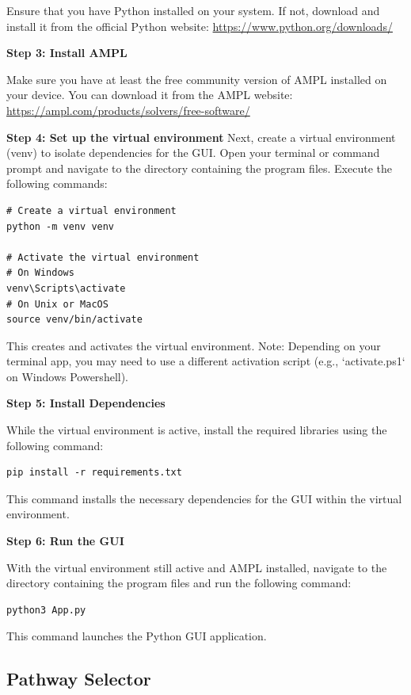 Ensure that you have Python installed on your system. If not, download and install it from the official Python website: \url{https://www.python.org/downloads/}

\textbf{Step 3: Install AMPL}

Make sure you have at least the free community version of AMPL installed on your device. You can download it from the AMPL website: \url{https://ampl.com/products/solvers/free-software/}

\textbf{Step 4: Set up the virtual environment}
Next, create a virtual environment (venv) to isolate dependencies for the GUI. Open your terminal or command prompt and navigate to the directory containing the program files. Execute the following commands:

\begin{verbatim}
# Create a virtual environment
python -m venv venv

# Activate the virtual environment
# On Windows
venv\Scripts\activate
# On Unix or MacOS
source venv/bin/activate
\end{verbatim}

This creates and activates the virtual environment. Note: Depending on your terminal app, you may need to use a different activation script (e.g., `activate.ps1` on Windows Powershell).

\textbf{Step 5: Install Dependencies}

While the virtual environment is active, install the required libraries using the following command:

\begin{verbatim}
pip install -r requirements.txt
\end{verbatim}

This command installs the necessary dependencies for the GUI within the virtual environment.


\textbf{Step 6: Run the GUI}

With the virtual environment still active and AMPL installed, navigate to the directory containing the program files and run the following command:

\begin{verbatim}
python3 App.py
\end{verbatim}

This command launches the Python GUI application.

\subsection{Pathway Selector}

